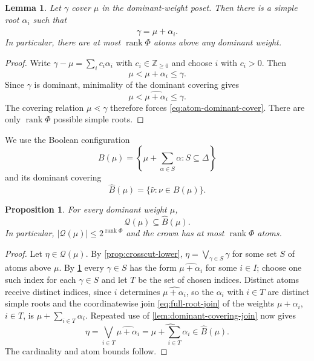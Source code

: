 \documentclass[11pt]{article}
\newtheorem{proposition}[proposition]{Proposition}
\newtheorem{lemma}[lemma]{Lemma}
\theoremstyle{definition}
\theoremstyle{remark}
\newcommand{\Raiz}{\Phi}
\newcommand{\RaizSimp}{\Delta}
\newcommand{\QO}{\mathscr{Q}}
\newcommand{\Z}{\mathbb Z}
\begin{document}
\begin{lemma}\label{lem:atoms-simple-roots}
Let $\gamma$ cover $\mu$ in the dominant-weight poset.  Then there is a simple
root $\alpha_i$ such that
\begin{equation}\label{eq:atom-dominant-cover}
     \gamma=\widehat{\mu+\alpha_i}.
\end{equation}
In particular, there are at most $\operatorname{rank}\Raiz$ atoms above any
dominant weight.
\end{lemma}

\begin{proof}
Write
$\gamma-\mu=\sum_i c_i\alpha_i$ with $c_i\in\Z_{\ge0}$ and choose $i$ with
$c_i>0$.  Then
\[
      \mu<\mu+\alpha_i\le\gamma.
\]
Since $\gamma$ is dominant, minimality of the dominant covering gives
\[
      \mu<\widehat{\mu+\alpha_i}\le\gamma.
\]
The covering relation $\mu\lessdot\gamma$ therefore forces
\eqref{eq:atom-dominant-cover}.  There are only
$\operatorname{rank}\Raiz$ possible simple roots.
\end{proof}

We use the Boolean configuration
\begin{equation}\label{eq:boolean-envelope}
   B(\mu)
      =\left\{\mu+\sum_{\alpha\in S}\alpha:
                    S\subseteq\RaizSimp\right\}
\end{equation}
and its dominant covering
\[
   \widehat B(\mu)=\{\widehat\nu:\nu\in B(\mu)\}.
\]

\begin{proposition}\label{prop:crown-envelope}
For every dominant weight $\mu$,
\begin{equation}\label{eq:crown-envelope}
       \QO(\mu)\subseteq\widehat B(\mu).
\end{equation}
In particular, $|\QO(\mu)|\le2^{\operatorname{rank}\Raiz}$ and the crown has
at most $\operatorname{rank}\Raiz$ atoms.
\end{proposition}

\begin{proof}
Let $\eta\in\QO(\mu)$.  By \cref{prop:crosscut-lower},
$\eta=\bigvee_{\gamma\in S}\gamma$ for some set $S$ of atoms above $\mu$.  By
\cref{lem:atoms-simple-roots} every $\gamma\in S$ has the form
$\widehat{\mu+\alpha_i}$ for some $i\in I$; choose one such index for each
$\gamma\in S$ and let $T$ be the set of chosen indices.  Distinct atoms
receive distinct indices, since $i$ determines $\widehat{\mu+\alpha_i}$, so
the $\alpha_i$ with $i\in T$ are distinct simple roots and the coordinatewise
join \eqref{eq:full-root-join} of the weights $\mu+\alpha_i$, $i\in T$, is
$\mu+\sum_{i\in T}\alpha_i$.  Repeated use of
\cref{lem:dominant-covering-join} now gives
\[
   \eta
      =\bigvee_{i\in T}\widehat{\mu+\alpha_i}
      =\widehat{\mu+\sum_{i\in T}\alpha_i}
      \in\widehat B(\mu).
\]
The cardinality and atom bounds follow.
\end{proof}
\end{document}
